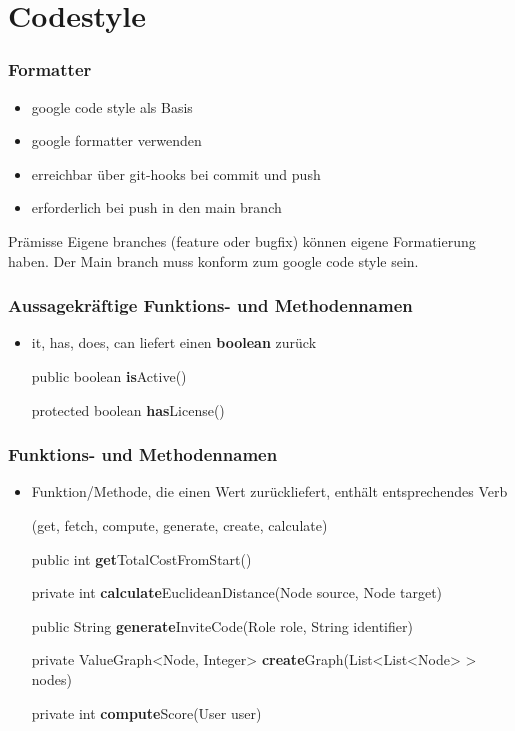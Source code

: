 \section{Codestyle}
\begin{frame}
  \frametitle{Formatter}
  \begin{itemize}
  \item google code style als Basis
  \item google formatter verwenden
  \item erreichbar über git-hooks bei commit und push
  \item erforderlich bei push in den main branch
  \end{itemize}
  \begin{block}{Prämisse}
    Eigene branches (feature oder bugfix) können eigene Formatierung haben. Der Main branch muss konform zum google code style sein.
    \end{block}
\end{frame}

\begin{frame}
  \frametitle{Aussagekräftige Funktions- und Methodennamen}
  \begin{itemize}
  \item it, has, does, can liefert einen \textbf{boolean} zurück
  \begin{Beispiel}
  \par public boolean \textbf{is}Active() 
  \par protected boolean \textbf{has}License()
    \end{Beispiel}
  \end{itemize}
\end{frame}

\begin{frame}
  \frametitle{Funktions- und Methodennamen}
  \begin{itemize}
  \item Funktion/Methode, die einen Wert zurückliefert, enthält entsprechendes Verb \par(get, fetch, compute, generate, create, calculate)
  \begin{Beispiel}
  \par public int \textbf{get}TotalCostFromStart()
  \par private int \textbf{calculate}EuclideanDistance(Node source, Node target)
  \par public String \textbf{generate}InviteCode(Role role, String identifier)
  \par private ValueGraph<Node, Integer> \textbf{create}Graph(List<List<Node> > nodes)
  \par private int \textbf{compute}Score(User user)
  \end{Beispiel}
  \end{itemize}

\end{frame}

